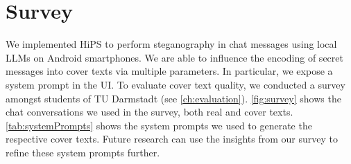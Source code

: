 
\chapter{Survey}\label{ch:survey}
\glsresetall %

We implemented \gls{HiPS} to perform steganography in chat messages using local \glspl{LLM} on Android smartphones. We are able to influence the encoding of secret messages into cover texts via multiple parameters. In particular, we expose a system prompt in the \gls{UI}. To evaluate cover text quality, we conducted a survey amongst students of TU Darmstadt (see \cref{ch:evaluation}). \cref{fig:survey} shows the chat conversations we used in the survey, both real and cover texts. \cref{tab:systemPrompts} shows the system prompts we used to generate the respective cover texts. Future research can use the insights from our survey to refine these system prompts further.

